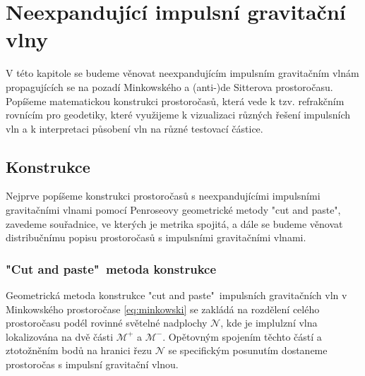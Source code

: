\chapter{Neexpandující impulsní gravitační vlny}
V této kapitole se budeme věnovat neexpandujícím impulsním gravitačním vlnám propagujících se na pozadí Minkowského a (anti-)de Sitterova
prostoročasu. Popíšeme matematickou konstrukci prostoročasů, která vede k tzv. refrakčním rovnícím pro geodetiky, které využijeme k vizualizaci různých
řešení impulsních vln a k interpretaci působení vln na různé testovací částice.


\section{Konstrukce}
Nejprve popíšeme konstrukci prostoročasů s neexpandujícími impulsními gravitačními vlnami
pomocí Penroseovy geometrické metody \cite{Penrose:1972xrn} "cut and paste", zavedeme souřadnice, ve
kterých je metrika spojitá, a dále se budeme věnovat distribučnímu popisu prostoročasů s impulsními gravitačními
vlnami.

\subsection{"Cut and paste"\ metoda konstrukce}
\label{sec:cut_and_paste_konstrukce1}
Geometrická metoda konstrukce "cut and paste"\ impulsních gravitačních vln v Minkowského prostoročase \eqref{eq:minkowski} se zakládá na rozdělení celého prostoročasu podél rovinné
světelné nadplochy $\mathcal{N}$, kde je implulzní vlna lokalizována na dvě části $\mathcal{M}^+$ a $\mathcal{M}^-$. Opětovným spojením těchto částí a ztotožněním bodů na hranici
řezu $\mathcal{N}$ se specifickým posunutím dostaneme prostoročas s impulsní gravitační vlnou.

